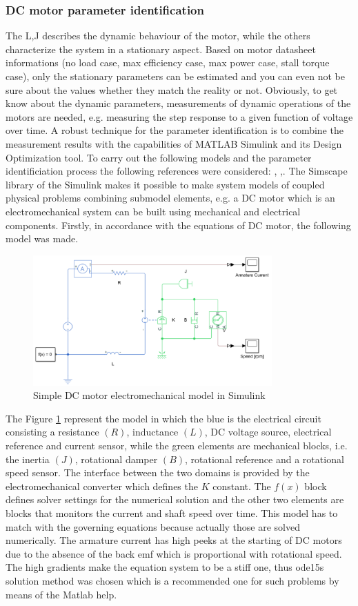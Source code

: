 \documentclass[12pt,english]{article}
\begin{document}
\subsubsection{DC motor parameter identification}
The L,J describes the dynamic behaviour of the motor, while the others characterize the system in a stationary aspect. Based on motor datasheet informations (no load case, max efficiency case, max power case, stall torque case), only the stationary parameters can be estimated and you can even not be sure about the values whether they match the reality or not. Obviously, to get know about the dynamic parameters, measurements of dynamic operations of the motors are needed, e.g. measuring the step response to a given function of voltage over time. A robust technique for the parameter identification is to combine the measurement results with the capabilities of MATLAB Simulink and its Design Optimization tool. To carry out the following models and the parameter identificiation process the following references were considered: \cite{par_est_1}, \cite{par_est_2},\cite{par_est_3}. The Simscape library of the Simulink makes it possible to make system models of coupled physical problems combining submodel elements, e.g. a DC motor which is an electromechanical system can be built using mechanical and electrical components.
Firstly, in accordance with the equations of DC motor, the following model was made.
\begin{figure}[htb!]
	\centering
	\includegraphics[height=5cm]{figures/simulink_dc_motor.png}
	\caption{Simple DC motor electromechanical model in Simulink}
	\label{simulink_dc_motor}
\end{figure}
The Figure \ref{simulink_dc_motor} represent the model in which the blue is the electrical circuit consisting a resistance $(R)$, inductance $(L)$, DC voltage source, electrical reference and current sensor, while the green elements are mechanical blocks, i.e. the inertia $(J)$, rotational damper $(B)$, rotational reference and a rotational speed sensor. The interface between the two domains is provided by the electromechanical converter which defines the $K$ constant. The $f(x)$ block defines solver settings for the numerical solution and the other two elements are blocks that monitors the current and shaft speed over time. This model has to match with the governing equations because actually those are solved numerically. The armature current has high peeks at the starting of DC motors due to the absence of the back emf which is proportional with rotational speed. The high gradients make the equation system to be a stiff one, thus ode15s solution method was chosen which is a recommended one for such problems by means of the Matlab help.
\end{document}
